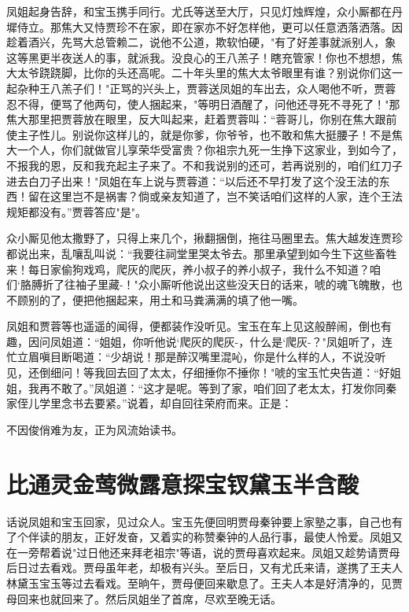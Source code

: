 凤姐起身告辞，和宝玉携手同行。尤氏等送至大厅，只见灯烛辉煌，众小厮都在丹墀侍立。那焦大又恃贾珍不在家，即在家亦不好怎样他，更可以任意洒落洒落。因趁着酒兴，先骂大总管赖二，说他不公道，欺软怕硬，"有了好差事就派别人，象这等黑更半夜送人的事，就派我。没良心的王八羔子！瞎充管家！你也不想想，焦大太爷跷跷脚，比你的头还高呢。二十年头里的焦大太爷眼里有谁？别说你们这一起杂种王八羔子们！"正骂的兴头上，贾蓉送凤姐的车出去，众人喝他不听，贾蓉忍不得，便骂了他两句，使人捆起来，"等明日酒醒了，问他还寻死不寻死了！"那焦大那里把贾蓉放在眼里，反大叫起来，赶着贾蓉叫：“蓉哥儿，你别在焦大跟前使主子性儿。别说你这样儿的，就是你爹，你爷爷，也不敢和焦大挺腰子！不是焦大一个人，你们就做官儿享荣华受富贵？你祖宗九死一生挣下这家业，到如今了，不报我的恩，反和我充起主子来了。不和我说别的还可，若再说别的，咱们红刀子进去白刀子出来！"凤姐在车上说与贾蓉道：“以后还不早打发了这个没王法的东西！留在这里岂不是祸害？倘或亲友知道了，岂不笑话咱们这样的人家，连个王法规矩都没有。”贾蓉答应"是"。

众小厮见他太撒野了，只得上来几个，揪翻捆倒，拖往马圈里去。焦大越发连贾珍都说出来，乱嚷乱叫说：“我要往祠堂里哭太爷去。那里承望到如今生下这些畜牲来！每日家偷狗戏鸡，爬灰的爬灰，养小叔子的养小叔子，我什么不知道？咱们`胳膊折了往袖子里藏-！"众小厮听他说出这些没天日的话来，唬的魂飞魄散，也不顾别的了，便把他捆起来，用土和马粪满满的填了他一嘴。

凤姐和贾蓉等也遥遥的闻得，便都装作没听见。宝玉在车上见这般醉闹，倒也有趣，因问凤姐道：“姐姐，你听他说`爬灰的爬灰-，什么是`爬灰-？"凤姐听了，连忙立眉嗔目断喝道：“少胡说！那是醉汉嘴里混吣，你是什么样的人，不说没听见，还倒细问！等我回去回了太太，仔细捶你不捶你！"唬的宝玉忙央告道：“好姐姐，我再不敢了。”凤姐道：“这才是呢。等到了家，咱们回了老太太，打发你同秦家侄儿学里念书去要紧。”说着，却自回往荣府而来。正是：

不因俊俏难为友，正为风流始读书。

\chapter{比通灵金莺微露意\ttlbreak 探宝钗黛玉半含酸}

话说凤姐和宝玉回家，见过众人。宝玉先便回明贾母秦钟要上家塾之事，自己也有了个伴读的朋友，正好发奋，又着实的称赞秦钟的人品行事，最使人怜爱。凤姐又在一旁帮着说"过日他还来拜老祖宗"等语，说的贾母喜欢起来。凤姐又趁势请贾母后日过去看戏。贾母虽年老，却极有兴头。至后日，又有尤氏来请，遂携了王夫人林黛玉宝玉等过去看戏。至晌午，贾母便回来歇息了。王夫人本是好清净的，见贾母回来也就回来了。然后凤姐坐了首席，尽欢至晚无话。

